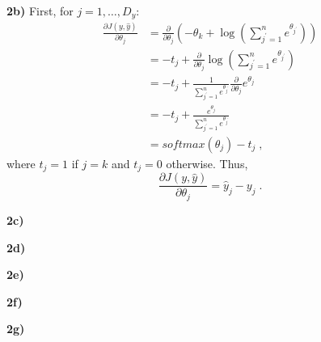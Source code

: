 \documentclass{article}
\begin{document}
\textbf{2b)} First, for $j = 1, \dots, D_{y}$:
\begin{align*}
\frac{\partial J(y,\hat{y})}{\partial \theta_j}  & = \frac{\partial}{\partial \theta_j}(- \theta_k + \log(\sum_{j^{\prime}=1}^{n} e^{\theta_{j^{\prime}}})) \\
& = - t_j + \frac{\partial}{\partial \theta_j}\log(\sum_{j^{\prime}=1}^{n} e^{\theta_{j^{\prime}}}) \\
& = - t_j + \frac{1}{\sum_{j^{\prime}=1}^{n} e^{\theta_{j^{\prime}}}}\frac{\partial}{\partial \theta_j} e^{\theta_{j}} \\
& = - t_j + \frac{e^{\theta_{j}}}{\sum_{j^{\prime}=1}^{n} e^{\theta_{j^{\prime}}}}\\
& = softmax(\theta_{j}) - t_j \; ,
\end{align*}
where $t_j = 1$ if $j=k$ and $t_j = 0$ otherwise. Thus,
\begin{equation}\label{eq:7}
\frac{\partial J(y,\hat{y})}{\partial \theta_j} = \hat{y}_{j} - y_{j} \; .
\end{equation}


\textbf{2c)}

\textbf{2d)}

\textbf{2e)}

\textbf{2f)}

\textbf{2g)}
\end{document}

